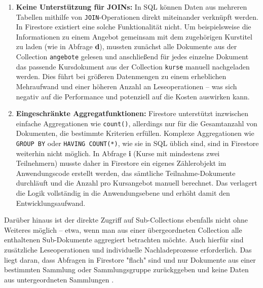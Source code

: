 \documentclass[12pt,a4paper%
              ,oneside     %
              ,titlepage
              ,DIV=13
              ,headinclude
              ,footinclude=false%
              ,cleardoublepage=empty%
              ,parskip=half,
              BCOR=0mm,
              ]{scrreprt}
\begin{document}
\begin{enumerate}
	\item \textbf{Keine Unterstützung für JOINs:} 
	In SQL können Daten aus mehreren Tabellen mithilfe von \texttt{JOIN}-Operationen direkt miteinander verknüpft werden. In Firestore existiert eine solche Funktionalität nicht. Um beispielsweise die Informationen zu einem Angebot gemeinsam mit dem zugehörigen Kurstitel zu laden (wie in Abfrage \textbf{d}), mussten zunächst alle Dokumente aus der Collection \texttt{angebote} gelesen und anschließend für jedes einzelne Dokument das passende Kursdokument aus der Collection \texttt{kurse} manuell nachgeladen werden. Dies führt bei größeren Datenmengen zu einem erheblichen Mehraufwand und einer höheren Anzahl an Leseoperationen – was sich negativ auf die Performance und potenziell auf die Kosten auswirken kann.
	\item \textbf{Eingeschränkte Aggregatfunktionen:}
    Firestore unterstützt inzwischen einfache Aggregationen wie \texttt{count()}, allerdings nur für die Gesamtanzahl von Dokumenten, die bestimmte Kriterien erfüllen. Komplexe Aggregationen wie \texttt{GROUP BY} oder \texttt{HAVING COUNT(*)}, wie sie in SQL üblich sind, sind in Firestore weiterhin nicht möglich. In Abfrage \textbf{i} (Kurse mit mindestens zwei Teilnehmern) musste daher in Firestore ein eigenes Zählerobjekt im Anwendungscode erstellt werden, das sämtliche Teilnahme-Dokumente durchläuft und die Anzahl pro Kursangebot manuell berechnet. Das verlagert die Logik vollständig in die Anwendungsebene und erhöht damit den Entwicklungsaufwand.
\end{enumerate}

Darüber hinaus ist der direkte Zugriff auf Sub-Collections ebenfalls nicht ohne Weiteres möglich – etwa, wenn man aus einer übergeordneten Collection alle enthaltenen Sub-Dokumente aggregiert betrachten möchte. Auch hierfür sind zusätzliche Leseoperationen und individuelle Nachladeprozesse erforderlich. Das liegt daran, dass Abfragen in Firestore "flach" sind und nur Dokumente aus einer bestimmten Sammlung oder Sammlungsgruppe zurückggeben und keine Daten aus untergeordneten Sammlungen \cite{FirebaseComparison.2025}.
\end{document}
